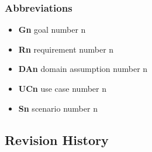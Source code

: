 \subsubsection{Abbreviations}
\begin{itemize}
        \item \textbf{Gn} goal number n
        \item \textbf{Rn} requirement number n
        \item \textbf{DAn} domain assumption number n
        \item \textbf{UCn} use case number n
        \item \textbf{Sn} scenario number n
\end{itemize}

\subsection{Revision History}

